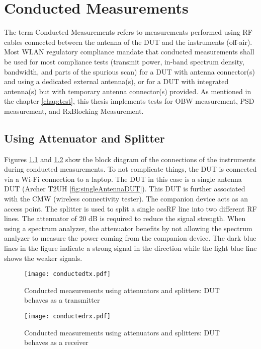 \chapter{Conducted Measurements} \label{chap:5}

The term Conducted Measurements refers to measurements performed using \acs{RF} cables connected between the antenna of the \acs{DUT} and the instruments (off-air). Most \acs{WLAN} regulatory compliance mandate that conducted measurements shall be used for most compliance tests (transmit power, in-band spectrum density, bandwidth, and parts of the spurious scan) for a \acs{DUT} with antenna connector(s) and using a dedicated external antenna(s), or for a \acs{DUT} with integrated antenna(s) but with temporary antenna connector(s) provided. As mentioned in the chapter \ref{chap:test}, this thesis implements tests for \acf{OBW} measurement, \acf{PSD} measurement, and \acf{RxBlocking} Measurement.

\section{Using Attenuator and Splitter}
\label{sec:att}
Figures \ref{fig:Ng1} and \ref{fig:Ng2} show the block diagram of the connections of the instruments during conducted measurements. To not complicate things, the \acs{DUT} is connected via a Wi-Fi connection to a laptop. The \acs{DUT} in this case is a single antenna \acs{DUT} (Archer T2UH \ref{fig:singleAntennaDUT}). This DUT is further associated with the \ac{CMW} (wireless connectivity tester). The companion device acts as an access point. The splitter is used to split a single acs{RF} line into two different \acs{RF} lines. The attenuator of 20 dB is required to reduce the signal strength. When using a spectrum analyzer, the attenuator benefits by not allowing the spectrum analyzer to measure the power coming from the companion device. The dark blue lines in the figure indicate a strong signal in the direction while the light blue line shows the weaker signals. \\

\begin{figure}[H]
\centering
\texttt{[image: conductedtx.pdf]}
 \caption{Conducted measurements using attenuators and splitters: \acs{DUT} behaves as a transmitter}
 \label{fig:Ng1} 
\end{figure}

\begin{figure}[H]
\centering
   \texttt{[image: conductedrx.pdf]}
   \caption{Conducted measurements using attenuators and splitters: \acs{DUT} behaves as a receiver}
   \label{fig:Ng2}
\end{figure}

